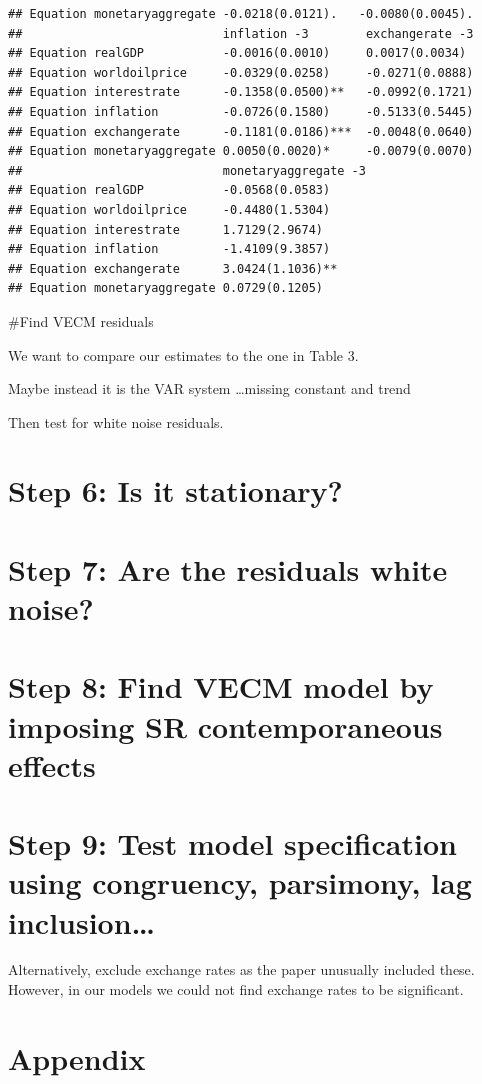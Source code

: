 \documentclass[11pt,preprint, authoryear]{elsarticle}
\numberwithin{equation}{section}
\numberwithin{figure}{section}
\numberwithin{table}{section}
\begin{document}
\begin{verbatim}
## Equation monetaryaggregate -0.0218(0.0121).   -0.0080(0.0045).   
##                            inflation -3        exchangerate -3    
## Equation realGDP           -0.0016(0.0010)     0.0017(0.0034)     
## Equation worldoilprice     -0.0329(0.0258)     -0.0271(0.0888)    
## Equation interestrate      -0.1358(0.0500)**   -0.0992(0.1721)    
## Equation inflation         -0.0726(0.1580)     -0.5133(0.5445)    
## Equation exchangerate      -0.1181(0.0186)***  -0.0048(0.0640)    
## Equation monetaryaggregate 0.0050(0.0020)*     -0.0079(0.0070)    
##                            monetaryaggregate -3
## Equation realGDP           -0.0568(0.0583)     
## Equation worldoilprice     -0.4480(1.5304)     
## Equation interestrate      1.7129(2.9674)      
## Equation inflation         -1.4109(9.3857)     
## Equation exchangerate      3.0424(1.1036)**    
## Equation monetaryaggregate 0.0729(0.1205)
\end{verbatim}

\#Find VECM residuals

We want to compare our estimates to the one in Table 3.

Maybe instead it is the VAR system \ldots missing constant and trend

Then test for white noise residuals.

\hypertarget{step-6-is-it-stationary}{%
\section{Step 6: Is it stationary?}\label{step-6-is-it-stationary}}

\hypertarget{step-7-are-the-residuals-white-noise}{%
\section{Step 7: Are the residuals white
noise?}\label{step-7-are-the-residuals-white-noise}}

\hypertarget{step-8-find-vecm-model-by-imposing-sr-contemporaneous-effects}{%
\section{Step 8: Find VECM model by imposing SR contemporaneous
effects}\label{step-8-find-vecm-model-by-imposing-sr-contemporaneous-effects}}

\hypertarget{step-9-test-model-specification-using-congruency-parsimony-lag-inclusion}{%
\section{Step 9: Test model specification using congruency, parsimony,
lag
inclusion\ldots{}}\label{step-9-test-model-specification-using-congruency-parsimony-lag-inclusion}}

Alternatively, exclude exchange rates as the paper unusually included
these. However, in our models we could not find exchange rates to be
significant.

\hypertarget{appendix}{%
\section*{Appendix}\label{appendix}}


\end{document}

